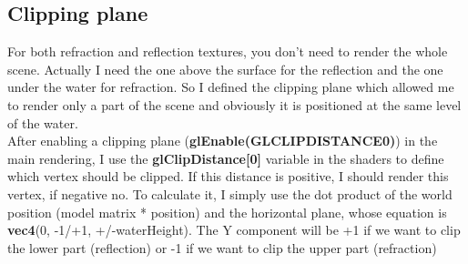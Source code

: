 \subsection{Clipping plane}
For both refraction and reflection textures, you don't need to render the whole scene. Actually I need the one above the surface for the reflection and the one under the water for refraction. So I defined the clipping plane which allowed me to render only a part of the scene and obviously it is positioned at the same level of the water. \\
After enabling a clipping plane (\textbf{glEnable(GL\textunderscore CLIP\textunderscore DISTANCE0)}) in the main rendering, I use the \textbf{gl\textunderscore ClipDistance[0]} variable in the shaders to define which vertex should be clipped. If this distance is positive, I should render this vertex, if negative no. To calculate it, I simply use the dot product of the world position (model matrix * position) and the horizontal plane, whose equation is \textbf{vec4}(0, -1/+1, +/-waterHeight). The Y component will be +1 if we want to clip the lower part (reflection) or -1 if we want to clip the upper part (refraction)

\newpage

\begin{figure}[hbt!]
	\centering
	\qquad
	\caption{}
\end{figure}

